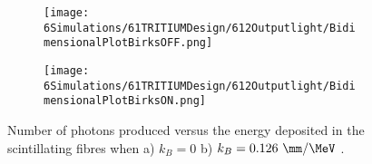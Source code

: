 \begin{figure}
\centering
    \begin{subfigure}[b]{0.4\textwidth}
    \centering
    \texttt{[image: 6Simulations/61TRITIUMDesign/612Outputlight/BidimensionalPlotBirksOFF.png]}  
    \caption{\label{subfig:2DimPlotNoBirks}}
    \end{subfigure}
    \hfill
    \begin{subfigure}[b]{0.4\textwidth}
    \centering
    \texttt{[image: 6Simulations/61TRITIUMDesign/612Outputlight/BidimensionalPlotBirksON.png]}  
    \caption{\label{subfig:2DimPlotBirks}}
    \end{subfigure}
 \caption{Number of photons produced versus the energy deposited in the scintillating fibres when a) $k_B=0$ b) $k_B=0.126~\mm/\MeV$ \cite{SimulationPaperCarlos}.}
 \label{fig:2DimPlotBirks}
\end{figure}